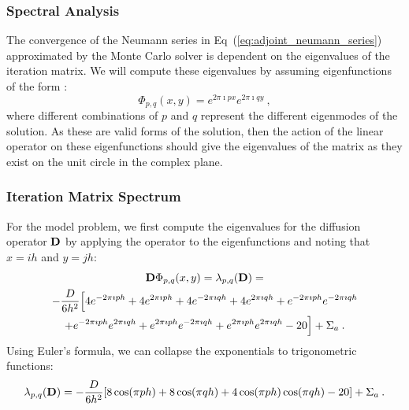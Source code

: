 \subsubsection{Spectral Analysis}
\label{subsec:spectral_analysis}
The convergence of the Neumann series in
Eq~(\ref{eq:adjoint_neumann_series}) approximated by the Monte Carlo
solver is dependent on the eigenvalues of the iteration matrix. We
will compute these eigenvalues by assuming eigenfunctions of the form
\citep{leveque_finite_2007}:
\begin{equation}
  \Phi_{p,q}(x,y) = e^{2 \pi \imath p x} e^{2 \pi \imath q y}\:,
  \label{eq:eigenfunction_form}
\end{equation}
where different combinations of $p$ and $q$ represent the different
eigenmodes of the solution. As these are valid forms of the solution,
then the action of the linear operator on these eigenfunctions should
give the eigenvalues of the matrix as they exist on the unit circle in
the complex plane.

\subsubsection{Iteration Matrix Spectrum}
\label{subsec:iteration_spectrum}
For the model problem, we first compute the eigenvalues for the
diffusion operator $\mathbf{D}$ by applying the operator to the
eigenfunctions and noting that $x=ih$ and $y=jh$:
\begin{multline}
  \mathbf{D}\Phi_{p,q}(x,y) = \lambda_{p,q}(\mathbf{D})
  =\\ -\frac{D}{6h^2}\Big[4 e^{-2 \pi \imath p h} + 4 e^{2 \pi \imath
      p h} + 4 e^{-2 \pi \imath q h} + 4 e^{2 \pi \imath q h} + e^{-2
      \pi \imath p h} e^{-2 \pi \imath q h} \\ + e^{-2 \pi \imath p h}
    e^{2 \pi \imath q h} + e^{2 \pi \imath p h} e^{-2 \pi \imath q h}
    + e^{2 \pi \imath p h} e^{2 \pi \imath q h} - 20\Big] + \Sigma_a
  \:.
  \label{eq:deriv_diff_1}
\end{multline}
Using Euler's formula, we can collapse the exponentials to
trigonometric functions:
\begin{equation}
  \lambda_{p,q}(\mathbf{D}) = -\frac{D}{6h^2}[ 8 \cos(\pi p h) + 8
    \cos(\pi q h) + 4 \cos(\pi p h) \cos(\pi q h) - 20] + \Sigma_a\:.
  \label{eq:deriv_diff_2}
\end{equation}

